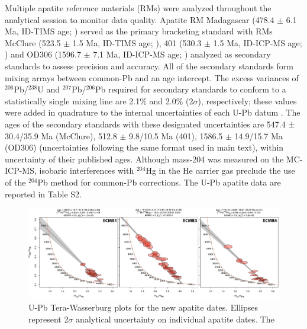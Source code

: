 \documentclass[11pt,letterpaper]{article}
\begin{document}
Multiple apatite reference materials (RMs) were analyzed throughout the analytical session to monitor data quality. Apatite RM Madagascar (478.4 $\pm$ 6.1 Ma, ID-TIMS age; \citealp{Thomson2012a}) served as the primary bracketing standard with RMs McClure (523.5 $\pm$ 1.5 Ma, ID-TIMS age; \citealp{Schoene2006a}), 401 (530.3 $\pm$ 1.5 Ma, ID-ICP-MS age; \citealp{Thompson2016a}) and OD306 (1596.7 $\pm$ 7.1 Ma, ID-ICP-MS age; \citealp{Thompson2016a}) analyzed as secondary standards to assess precision and accuracy. All of the secondary standards form mixing arrays between common-Pb and an age intercept. The excess variances of $^{206}$Pb/$^{238}$U and $^{207}$Pb/$^{206}$Pb required for secondary standards to conform to a statistically single mixing line are 2.1$\%$ and 2.0$\%$ (2$\sigma$), respectively; these values were added in quadrature to the internal uncertainties of each U-Pb datum \citep{Horstwood2016a}. The ages of the secondary standards with these designated uncertainties are 547.4 ± 30.4/35.9 Ma (McClure), 512.8 $\pm$ 9.8/10.5 Ma (401), 1586.5 $\pm$ 14.9/15.7 Ma (OD306) (uncertainties following the same format used in main text), within uncertainty of their published ages. Although mass-204 was measured on the MC-ICP-MS, isobaric interferences with $^{204}$Hg in the He carrier gas preclude the use of the $^{204}$Pb method for common-Pb corrections. The U-Pb apatite data are reported in Table S2.


\begin{figure}[!ht]
\noindent\includegraphics[width=\textwidth]{./figures/SI_apatite_TW.pdf}
\centering
\caption{\small{U-Pb Tera-Wasserburg plots for the new apatite dates. Ellipses represent 2$\sigma$ analytical uncertainty on individual apatite dates. The }}
\label{fig:apatite_TW}
\end{figure}




\end{document}
